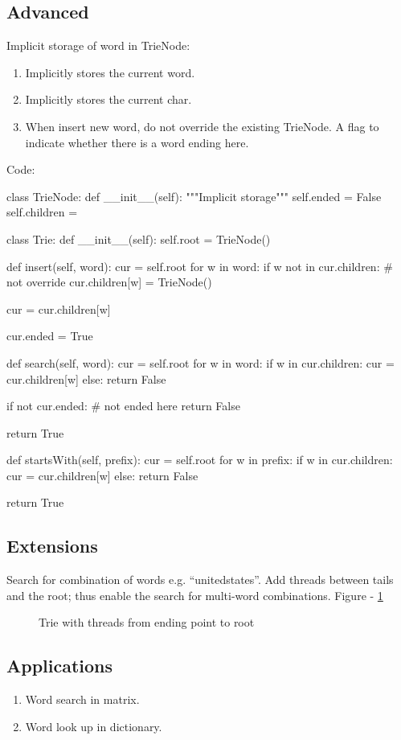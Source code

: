 \subsection{Advanced}
Implicit storage of word in TrieNode: 
\begin{enumerate}
\item Implicitly stores the current word. 
\item Implicitly stores the current char. 
\item When insert new word, do not override the existing TrieNode. A flag to indicate
whether there is a word ending here.
\end{enumerate}
\newpage
Code:
\begin{python}
class TrieNode:
    def __init__(self):
        """Implicit storage"""
        self.ended = False
        self.children = {}


class Trie:
    def __init__(self):
        self.root = TrieNode()

    def insert(self, word):
        cur = self.root
        for w in word:
            if w not in cur.children:   # not override
                cur.children[w] = TrieNode()

            cur = cur.children[w]

        cur.ended = True

    def search(self, word):
        cur = self.root
        for w in word:
            if w in cur.children:
                cur = cur.children[w]
            else:
                return False

        if not cur.ended:  # not ended here
            return False

        return True

    def startsWith(self, prefix):
        cur = self.root
        for w in prefix:
            if w in cur.children:
                cur = cur.children[w]
            else:
                return False

        return True
\end{python}
\subsection{Extensions}
 Search for combination of words e.g. ``unitedstates''. Add threads between tails and the root; thus enable the search for multi-word combinations. Figure - \ref{fig:trie2}
\begin{figure}[!hbt]
\centering
{}
\caption{Trie with threads from ending point to root}
\label{fig:trie2}
\end{figure}
\subsection{Applications}
\begin{enumerate}
\item Word search in matrix.
\item Word look up in dictionary.
\end{enumerate}
        
     
